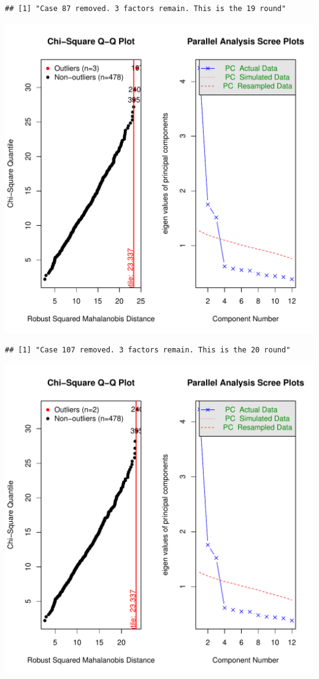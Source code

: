 \documentclass{article}\usepackage[]{graphicx}\usepackage[]{color}
\makeatletter
\def\maxwidth{ %
  \ifdim\Gin@nat@width>\linewidth
    \linewidth
  \else
    \Gin@nat@width
  \fi
}
\newenvironment{kframe}{%
 \def\at@end@of@kframe{}%
 \ifinner\ifhmode%
  \def\at@end@of@kframe{\end{minipage}}%
  \begin{minipage}{\columnwidth}%
 \fi\fi%
 \def\FrameCommand##1{\hskip\@totalleftmargin \hskip-\fboxsep
 \colorbox{shadecolor}{##1}\hskip-\fboxsep
     \hskip-\linewidth \hskip-\@totalleftmargin \hskip\columnwidth}%
 \MakeFramed {\advance\hsize-\width
   \@totalleftmargin\z@ \linewidth\hsize
   \@setminipage}}%
 {\par\unskip\endMakeFramed%
 \at@end@of@kframe}
\newenvironment{knitrout}{}{} %
\makeatother
\begin{document}
\begin{knitrout}
\begin{kframe}\begin{verbatim}
## [1] "Case 87 removed. 3 factors remain. This is the 19 round"
\end{verbatim}
\end{kframe}
\includegraphics[width=\maxwidth]{figure/unnamed-chunk-10-20} 
\begin{kframe}\begin{verbatim}
## [1] "Case 107 removed. 3 factors remain. This is the 20 round"
\end{verbatim}
\end{kframe}
\includegraphics[width=\maxwidth]{figure/unnamed-chunk-10-21} 

\end{knitrout}
\end{document}
